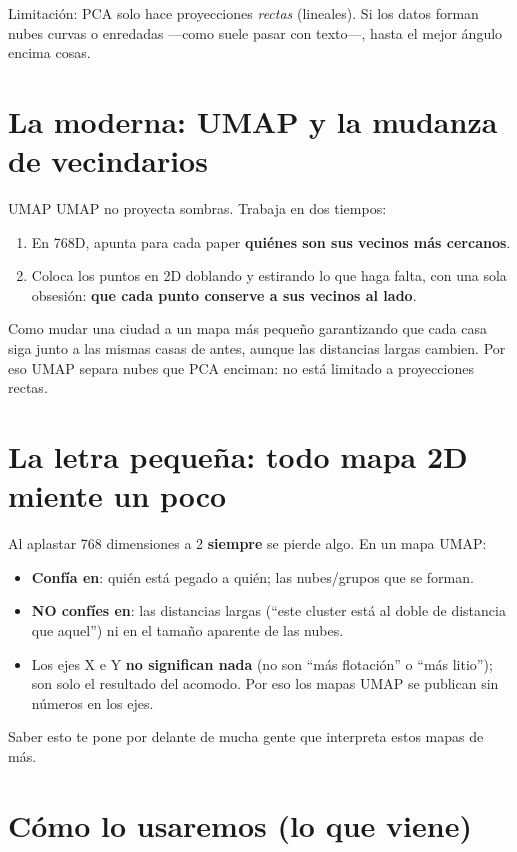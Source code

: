 \documentclass[11pt,a4paper]{article}
\begin{document}
Limitación: PCA solo hace proyecciones \emph{rectas} (lineales). Si los datos forman nubes
curvas o enredadas —como suele pasar con texto—, hasta el mejor ángulo encima cosas.

\section{La moderna: UMAP y la mudanza de vecindarios}

\begin{concepto}{UMAP}
UMAP no proyecta sombras. Trabaja en dos tiempos:
\begin{enumerate}
  \item En 768D, apunta para cada paper \textbf{quiénes son sus vecinos más cercanos}.
  \item Coloca los puntos en 2D doblando y estirando lo que haga falta, con una sola
        obsesión: \textbf{que cada punto conserve a sus vecinos al lado}.
\end{enumerate}
Como mudar una ciudad a un mapa más pequeño garantizando que cada casa siga junto a las
mismas casas de antes, aunque las distancias largas cambien. Por eso UMAP separa nubes que
PCA enciman: no está limitado a proyecciones rectas.
\end{concepto}

\section{La letra pequeña: todo mapa 2D miente un poco}

\begin{ojo}
Al aplastar 768 dimensiones a 2 \textbf{siempre} se pierde algo. En un mapa UMAP:
\begin{itemize}
  \item \textbf{Confía en}: quién está pegado a quién; las nubes/grupos que se forman.
  \item \textbf{NO confíes en}: las distancias largas (``este cluster está al doble de
        distancia que aquel'') ni en el tamaño aparente de las nubes.
  \item Los ejes X e Y \textbf{no significan nada} (no son ``más flotación'' o ``más
        litio''); son solo el resultado del acomodo. Por eso los mapas UMAP se publican
        sin números en los ejes.
\end{itemize}
Saber esto te pone por delante de mucha gente que interpreta estos mapas de más.
\end{ojo}

\section{Cómo lo usaremos (lo que viene)}
\end{document}
